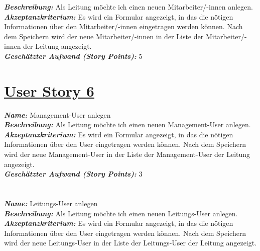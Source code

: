 \documentclass[12pt]{article}%
\begin{document}
\textbf{\textit{Beschreibung:}} Als Leitung möchte ich einen neuen Mitarbeiter/-innen anlegen.
\\

\textbf{\textit{Akzeptanzkriterium:}} Es wird ein Formular angezeigt, in das die nötigen Informationen über den Mitarbeiter/-innen eingetragen werden können. Nach dem Speichern wird der neue Mitarbeiter/-innen in der Liste der Mitarbeiter/-innen der Leitung angezeigt.
\\


\textbf{\textit{Geschätzter Aufwand (Story Points):}} 5
\\


\section*{\large \underline{User Story 6}}
\textit{\textbf{Name:}} Management-User anlegen
\\

\textbf{\textit{Beschreibung:}} Als Leitung möchte ich einen neuen Management-User anlegen.
\\

\textbf{\textit{Akzeptanzkriterium:}} Es wird ein Formular angezeigt, in das die nötigen Informationen über den User eingetragen werden können. Nach dem Speichern wird der neue Management-User in der Liste der Management-User der Leitung angezeigt.
\\

\textbf{\textit{Geschätzter Aufwand (Story Points):}} 3
\\


\section*{\large \underline{}}
\textit{\textbf{Name:}} Leitungs-User anlegen
\\

\textbf{\textit{Beschreibung:}} Als Leitung möchte ich einen neuen Leitungs-User anlegen.
\\

\textbf{\textit{Akzeptanzkriterium:}} Es wird ein Formular angezeigt, in das die nötigen Informationen über den User eingetragen werden können. Nach dem Speichern wird der neue Leitungs-User in der Liste der Leitungs-User der Leitung angezeigt.
\end{document}
